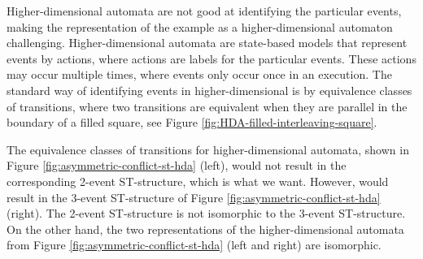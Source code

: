\begin{example}[Strong asymmetric conflict]
    
        Higher-dimensional automata are not good at identifying the particular events, making the representation of the example as a higher-dimensional automaton challenging. Higher-dimensional automata are state-based models that represent events by actions, where actions are labels for the particular events. These actions may occur multiple times, where events only occur once in an execution. The standard way of identifying events in higher-dimensional is by equivalence classes of transitions, where two transitions are equivalent when they are parallel in the boundary of a filled square, see Figure \ref{fig:HDA-filled-interleaving-square}.
    
        The equivalence classes of transitions for higher-dimensional automata, shown in Figure \ref{fig:asymmetric-conflict-st-hda} (left), would not result in the corresponding 2-event ST-structure, which is what we want. However, would result in the 3-event ST-structure of Figure \ref{fig:asymmetric-conflict-st-hda} (right). The 2-event ST-structure is not isomorphic to the 3-event ST-structure. On the other hand, the two representations of the higher-dimensional automata from Figure \ref{fig:asymmetric-conflict-st-hda} (left and right) are isomorphic.
    \end{example}



